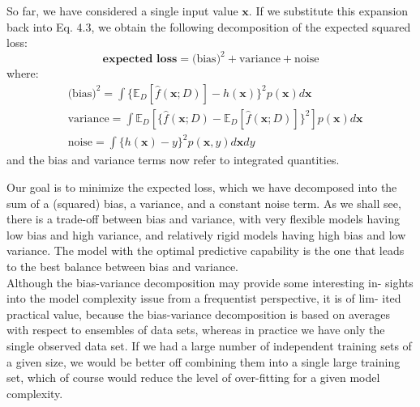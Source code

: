 \documentclass[twoside]{article}
\begin{document}
So far, we have considered a single input value $\boldsymbol{x}$. If we substitute this expansion back into Eq. 4.3, we obtain the following decomposition of the expected squared loss:
\begin{equation*}
    \textbf{expected loss} = \text{(bias)}^2 + \text{variance} + \text{noise}
\end{equation*}
where:
\begin{equation*}
\begin{aligned}
    &\text{(bias)}^2 = \int \{\mathbb{E}_D[\hat{f}(\boldsymbol{x}; D)] - h(\boldsymbol{x})\}^2 p(\boldsymbol{x})d\boldsymbol{x}\\
    &\text{variance} = \int \mathbb{E}_D[\{\hat{f}(\boldsymbol{x}; D) - \mathbb{E}_D[\hat{f}(\boldsymbol{x}; D)]\}^2] p(\boldsymbol{x})d\boldsymbol{x}\\
    &\text{noise} = \int\{ h(\boldsymbol{x}) - y\}^2p(\boldsymbol{x}, y)d\boldsymbol{x}dy
\end{aligned}
\end{equation*}
and the bias and variance terms now refer to integrated quantities.\medskip

Our goal is to minimize the expected loss, which we have decomposed into the sum of a (squared) bias, a variance, and a constant noise term. As we shall see, there is a trade-off between bias and variance, with very flexible models having low bias and high variance, and relatively rigid models having high bias and low variance. The model with the optimal predictive capability is the one that leads to the best balance between bias and variance.\\
Although the bias-variance decomposition may provide some interesting in- sights into the model complexity issue from a frequentist perspective, it is of lim- ited practical value, because the bias-variance decomposition is based on averages with respect to ensembles of data sets, whereas in practice we have only the single observed data set. If we had a large number of independent training sets of a given size, we would be better off combining them into a single large training set, which of course would reduce the level of over-fitting for a given model complexity.
\end{document}
